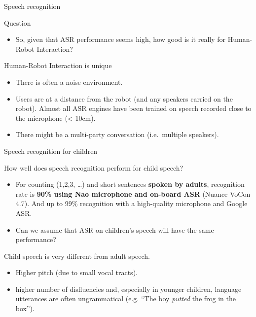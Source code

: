 \documentclass[compress]{beamer}
\begin{document}
\begin{frame}{Speech recognition}

Question

\begin{itemize}

\item
  So, given that ASR performance seems high, how good is it really for
  Human-Robot Interaction?
\end{itemize}

Human-Robot Interaction is unique

\begin{itemize}

\item
  There is often a noise environment.
\item
  Users are at a distance from the robot (and any speakers carried on
  the robot). Almost all ASR engines have been trained on speech
  recorded close to the microphone (\textless{} 10cm).
\item
  There might be a multi-party conversation (i.e.~multiple speakers).
\end{itemize}

\end{frame}

\begin{frame}{Speech recognition for children}

How well does speech recognition perform for child speech?

\begin{itemize}

\item
  For counting (1,2,3, \ldots{}) and short sentences \textbf{spoken by
  adults}, recognition rate is \textbf{90\% using Nao microphone and
  on-board ASR} (Nuance VoCon 4.7). And up to 99\% recognition with a
  high-quality microphone and Google ASR.
\item
  Can we assume that ASR on children's speech will have the same
  performance?
\end{itemize}

Child speech is very different from adult speech.

\begin{itemize}

\item
  Higher pitch (due to small vocal tracts).
\item
  higher number of disfluencies and, especially in younger children,
  language utterances are often ungrammatical (e.g. ``The boy
  \emph{putted} the frog in the box'').
\end{itemize}

\end{frame}
\end{document}
